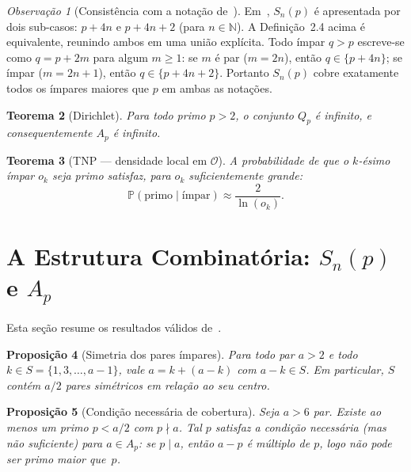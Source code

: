 \documentclass[12pt,a4paper]{article}
\newtheorem{theorem}{Teorema}[section]
\newtheorem{proposition}[theorem]{Proposi\c{c}\~ao}
\theoremstyle{remark}
\newtheorem{remark}[theorem]{Observa\c{c}\~ao}
\newcommand{\calO}{\mathcal{O}}
\newcommand{\NN}{\mathbb{N}}
\newcommand{\bP}{\mathbb{P}}
\begin{document}
	\begin{remark}[Consist\^encia com a nota\c{c}\~ao de~\cite{bandeira2026estrutura}]
		Em~\cite{bandeira2026estrutura}, $S_n(p)$ \'e apresentada por dois sub-casos:
		$p+4n$ e $p+4n+2$ (para $n\in\NN$). A Defini\c{c}\~ao~2.4 acima \'e
		equivalente, reunindo ambos em uma uni\~ao expl\'icita.
		Todo \'impar $q > p$ escreve-se como $q = p + 2m$ para algum $m \geq 1$:
		se $m$ \'e par ($m = 2n$), ent\~ao $q \in \{p+4n\}$;
		se \'impar ($m = 2n+1$), ent\~ao $q \in \{p+4n+2\}$.
		Portanto $S_n(p)$ cobre exatamente todos os \'impares maiores que $p$
		em ambas as nota\c{c}\~oes.
	\end{remark}
	
	\begin{theorem}[Dirichlet]
		Para todo primo $p>2$, o conjunto $Q_p$ \'e infinito, e consequentemente $A_p$ \'e infinito.
	\end{theorem}
	
	\begin{theorem}[TNP --- densidade local em $\calO$]
		A probabilidade de que o $k$-\'esimo \'impar $o_k$ seja primo satisfaz,
		para $o_k$ suficientemente grande:
		\[
		\bP(\text{primo}\mid\text{\'impar}) \approx \frac{2}{\ln(o_k)}.
		\]
	\end{theorem}
	
	\section{A Estrutura Combinat\'oria: $S_n(p)$ e $A_p$}
	
	Esta se\c{c}\~ao resume os resultados v\'alidos de~\cite{bandeira2026estrutura}.
	
	\begin{proposition}[Simetria dos pares ímpares]
		Para todo par $a>2$ e todo $k\in S=\{1,3,\ldots,a-1\}$, vale
		$a = k + (a-k)$ com $a-k\in S$.  Em particular, $S$ cont\'em $a/2$ pares
		sim\'etricos em rela\c{c}\~ao ao seu centro.
	\end{proposition}
	
	\begin{proposition}[Condição necessária de cobertura]
		\label{prop:cond-nec}
		Seja $a>6$ par. Existe ao menos um primo $p<a/2$ com $p\nmid a$.
		Tal $p$ satisfaz a condi\c{c}\~ao necess\'aria (mas n\~ao suficiente) para $a\in A_p$:
		se $p\mid a$, ent\~ao $a-p$ \'e m\'ultiplo de $p$, logo n\~ao pode ser primo maior que~$p$.
	\end{proposition}
	
\end{document}
